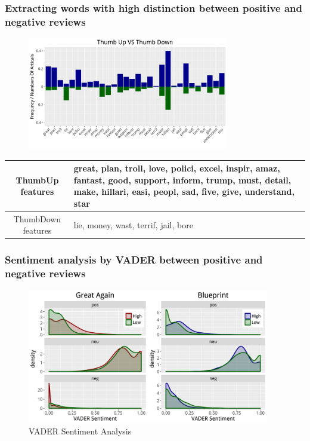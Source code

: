 \documentclass[9pt]{beamer}
\begin{document}
\begin{frame}
\frametitle{Extracting words with high distinction between positive and negative reviews}
\begin{figure}[H]
	\centering
	\includegraphics[width=250pt]{bagofwords_blue_bar.pdf}
\end{figure}
\begin{table}[H]
	\centering
	\begin{tabular}{cp{200pt}}
		\hline
		 ThumbUp features & great, plan, troll, love, polici, excel, inspir, amaz, fantast, good, support, inform, trump, must, detail, make, hillari, easi, peopl, sad, five, give, understand, star \\
		 \hline
		 ThumbDown features & lie, money, wast, terrif, jail, bore \\
		\hline
	\end{tabular}
\end{table}
\end{frame}

\begin{frame}
\frametitle{Sentiment analysis by VADER between positive and negative reviews}
\begin{figure}[H]
	\centering
	\includegraphics[width=300pt]{vader比较_density.pdf}
	\caption{VADER Sentiment Analysis}
\end{figure}
\end{frame}
\end{document}
